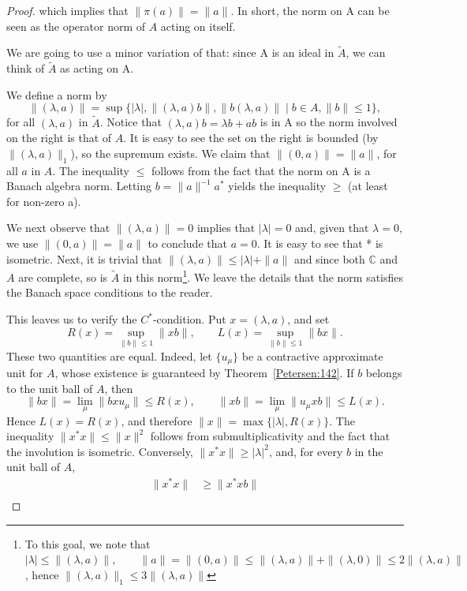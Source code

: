 \documentclass{book}
\begin{document}
\begin{proof}
  which implies that \(\|\pi(a)\| = \|a\|\). In short, the norm on A can be seen as
  the operator norm of \(A\) acting on itself.\par
  We are going to use a minor variation of that: since A is an ideal in \(\tilde{A}\),
  we can think of \(\tilde{A}\) as acting on A.\par
  We define a norm by
  \[\|(\lambda, a)\| = \sup\{|\lambda|, \|(\lambda,a)b\| , \|b(\lambda,a)\|\mid b \in A, \|b\| \leq 1\},\]
  for all \((\lambda,a)\) in \(\tilde{A}\). Notice that \((\lambda,a)b = \lambda b+ab\) is in A so the norm involved
  on the right is that of \(A\). It is easy to see the set on the right is bounded
  (by \(\|(\lambda,a)\|_1\)), so the supremum exists. We claim that \(\|(0,a)\| = \|a\|\), for
  all \(a\) in \(A\). The inequality \(\leq\) follows from the fact that the norm on A is a
  Banach algebra norm. Letting \(b = \|a\|^{-1} a^*\) yields the inequality \(\geq\) (at least
  for non-zero a).\par
  We next observe that \(\|(\lambda,a)\| = 0\) implies that \(|\lambda|=0\) and, given that \(\lambda=0\), we use \(\|(0,a)\|=\|a\|\) to
  conclude that \(a=0\). It is easy to see
  that * is isometric. Next, it is trivial that \(\|(\lambda,a)\| \leq |\lambda|+\|a\|\) and since both
  \(\mathbb{C}\) and \(A\) are complete, so is \(\tilde{A}\) in this norm\footnote{To this goal, we note that \(|\lambda|\leq \|(\lambda,a)\|,\qquad\|a\|=\|(0,a)\|\leq \|(\lambda,a)\|+\|(\lambda,0)\|\leq 2\|(\lambda,a)\|\),
  hence \(\|(\lambda,a)\|_1\leq 3\|(\lambda,a)\|\)}. We leave the details that the
  norm satisfies the Banach space conditions to the reader.\par
  This leaves us to verify the \(C^*\)-condition. Put \(x=(\lambda,a)\), and set
  \[
    R(x)=\sup_{\|b\|\leq1}\|xb\|,
    \qquad
    L(x)=\sup_{\|b\|\leq1}\|bx\|.
  \]
  These two quantities are equal. Indeed, let \(\{u_\mu\}\) be a contractive approximate unit for \(A\), whose existence is guaranteed by
  Theorem~\ref{Petersen:142}. If \(b\) belongs to the unit ball of \(A\), then
  \[
    \|bx\|=\lim_\mu\|bxu_\mu\|\leq R(x),
    \qquad
    \|xb\|=\lim_\mu\|u_\mu xb\|\leq L(x).
  \]
  Hence \(L(x)=R(x)\), and therefore \(\|x\|=\max\{|\lambda|,R(x)\}\). The inequality
  \(\|x^*x\|\leq\|x\|^2\) follows from submultiplicativity and the fact that the involution is isometric. Conversely,
  \(\|x^*x\|\geq|\lambda|^2\), and, for every \(b\) in the unit ball of \(A\),
  \begin{align*}
    \|x^*x\|&\geq\|x^*xb\|\\

\end{align*}
\end{proof}
\end{document}

